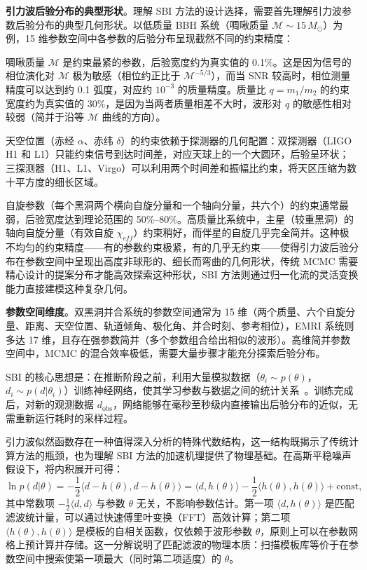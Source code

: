 \textbf{引力波后验分布的典型形状}。理解 SBI 方法的设计选择，需要首先理解引力波参数后验分布的典型几何形状。以低质量 BBH 系统（啁啾质量 $\mathcal{M} \sim 15\,M_\odot$）为例，15 维参数空间中各参数的后验分布呈现截然不同的约束精度：

啁啾质量 $\mathcal{M}$ 是约束最紧的参数，后验宽度约为真实值的 0.1\%。这是因为信号的相位演化对 $\mathcal{M}$ 极为敏感（相位约正比于 $\mathcal{M}^{-5/3}$），而当 SNR 较高时，相位测量精度可以达到约 0.1 弧度，对应约 $10^{-3}$ 的质量精度。质量比 $q = m_1/m_2$ 的约束宽度约为真实值的 30\%，是因为当两者质量相差不大时，波形对 $q$ 的敏感性相对较弱（简并于沿等 $\mathcal{M}$ 曲线的方向）。

天空位置（赤经 $\alpha$、赤纬 $\delta$）的约束依赖于探测器的几何配置：双探测器（LIGO H1 和 L1）只能约束信号到达时间差，对应天球上的一个大圆环，后验呈环状；三探测器（H1、L1、Virgo）可以利用两个时间差和振幅比约束，将天区压缩为数十平方度的细长区域。

自旋参数（每个黑洞两个横向自旋分量和一个轴向分量，共六个）的约束通常最弱，后验宽度达到理论范围的 50\%--80\%。高质量比系统中，主星（较重黑洞）的轴向自旋分量（有效自旋 $\chi_{eff}$）约束稍好，而伴星的自旋几乎完全简并。这种极不均匀的约束精度——有的参数约束极紧，有的几乎无约束——使得引力波后验分布在参数空间中呈现出高度非球形的、细长而弯曲的几何形状，传统 MCMC 需要精心设计的提案分布才能高效探索这种形状，SBI 方法则通过归一化流的灵活变换能力直接建模这种复杂几何。

\textbf{参数空间维度}。双黑洞并合系统的参数空间通常为 15 维（两个质量、六个自旋分量、距离、天空位置、轨道倾角、极化角、并合时刻、参考相位），EMRI 系统则多达 17 维，且存在强参数简并（多个参数组合给出相似的波形）。高维简并参数空间中，MCMC 的混合效率极低，需要大量步骤才能充分探索后验分布。

SBI 的核心思想是：在推断阶段之前，利用大量模拟数据（$\theta_i \sim p(\theta)$，$d_i \sim p(d|\theta_i)$）训练神经网络，使其学习参数与数据之间的统计关系~\cite{Cranmer2020SBI}。训练完成后，对新的观测数据 $d_\mathrm{obs}$，网络能够在毫秒至秒级内直接输出后验分布的近似，无需重新运行耗时的采样过程。

引力波似然函数存在一种值得深入分析的特殊代数结构，这一结构既揭示了传统计算方法的瓶颈，也为理解 SBI 方法的加速机理提供了物理基础。在高斯平稳噪声假设下，将内积展开可得：
\begin{equation}
  \ln p(d|\theta) = -\frac{1}{2}\langle d - h(\theta), d - h(\theta)\rangle = \langle d, h(\theta)\rangle - \frac{1}{2}\langle h(\theta), h(\theta)\rangle + \text{const},
\end{equation}
其中常数项 $-\frac{1}{2}\langle d, d\rangle$ 与参数 $\theta$ 无关，不影响参数估计。第一项 $\langle d, h(\theta)\rangle$ 是匹配滤波统计量，可以通过快速傅里叶变换（FFT）高效计算；第二项 $\langle h(\theta), h(\theta)\rangle$ 是模板的自相关函数，仅依赖于波形参数 $\theta$，原则上可以在参数网格上预计算并存储。这一分解说明了匹配滤波的物理本质：扫描模板库等价于在参数空间中搜索使第一项最大（同时第二项适度）的 $\theta$。

